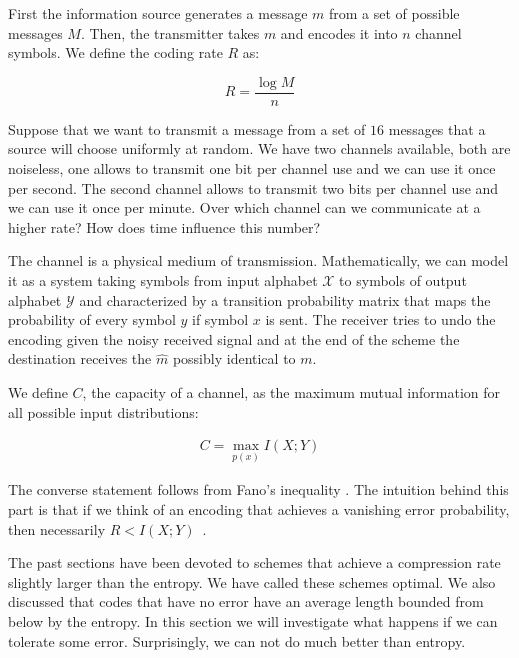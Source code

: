 First the information source generates a message $m$ from a set of possible messages $M$. Then, the transmitter takes $m$ and encodes it into $n$ channel symbols. We define the coding rate $R$ as:

\begin{equation}
R=\frac{\log M}{n}
\end{equation}

\begin{exercise}
Suppose that we want to transmit a message from a set of $16$ messages that a source will choose uniformly at random. We have two channels available, both are noiseless, one allows to transmit one bit per channel use and we can use it once per second. The second channel allows to transmit two bits per channel use and we can use it once per minute. Over which channel can we communicate at a higher rate? How does time influence this number?
\end{exercise}
The channel is a physical medium of transmission. Mathematically, we can model it as a system taking symbols from input alphabet $\mathcal{X}$ to symbols of output alphabet $\mathcal{Y}$ and characterized by a transition probability matrix that maps the probability of every symbol $y$ if symbol $x$ is sent. The receiver tries to undo the encoding given the noisy received signal and at the end of the scheme the destination receives the ${\hat{m}}$ possibly identical to $m$.

We define $C$, the capacity of a channel, as the maximum mutual information for all possible input distributions: 

\begin{eqnarray}
\label{eq:capform}
C = \max_{p(x)} I(X;Y)
\end{eqnarray}


The converse statement follows from Fano's inequality \cite{Fano_61}. The intuition behind this part is that if we think of an encoding that achieves a vanishing error probability, then necessarily $R<I(X;Y)$~\cite{Cover_91}. 

The past sections have been devoted to schemes that achieve a compression rate slightly larger than the entropy. We have called these schemes optimal. We also discussed that codes that have no error have an average length bounded from below by the entropy. In this section we will investigate what happens if we can tolerate some error. Surprisingly, we can not do much better than entropy. 

